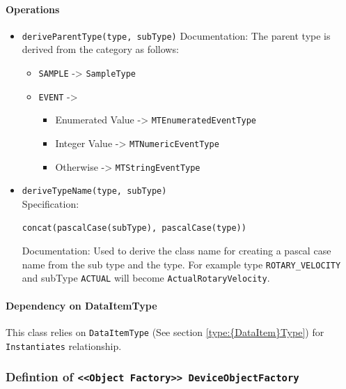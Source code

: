 \paragraph{Operations}
\begin{itemize}
  \item \texttt{deriveParentType(type, subType)}
    Documentation: The parent type is derived from the category as follows: 

\begin{itemize}
  \item \texttt{SAMPLE} -> \texttt{SampleType}
  \item \texttt{EVENT} ->
  \begin{itemize}
   \item Enumerated Value -> \texttt{MTEnumeratedEventType}
   \item Integer Value -> \texttt{MTNumericEventType}
   \item Otherwise -> \texttt{MTStringEventType}
  \end{itemize}
\end{itemize}

  \item \texttt{deriveTypeName(type, subType)}\\
    Specification:
   \indent \begin{Verbatim}[xleftmargin=.25in,fontsize=\small]
concat(pascalCase(subType), pascalCase(type))
\end{Verbatim}

    Documentation: Used to derive the class name for creating a pascal case name from the sub type and the type. 
For example type \texttt{ROTARY_VELOCITY} and subType \texttt{ACTUAL} will become \texttt{ActualRotaryVelocity}.

\end{itemize}
\paragraph{Dependency on {DataItem}Type}

This class relies on \texttt{{DataItem}Type} (See section \ref{type:{DataItem}Type}) for \texttt{Instantiates} relationship.

\FloatBarrier
\subsubsection{Defintion of \texttt{<<Object Factory>> DeviceObjectFactory}} \label{type:DeviceObjectFactory}

\FloatBarrier

